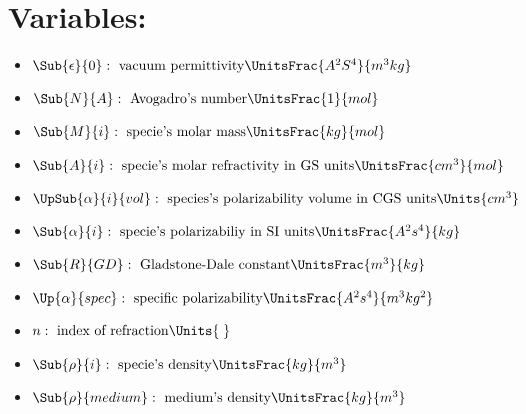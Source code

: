 



\usepackage{mcode}

    
    \section*{Variables:}
    \begin{itemize}
        \item $ \Sub{\epsilon}{0}:\text{ vacuum permittivity}\UnitsFrac{A^2S^4}{m^3kg} $ 
        \item $ \Sub{N}{A}:\text{ Avogadro's number}\UnitsFrac{1}{mol} $
        \item $ \Sub{M}{i}:\text{ specie's molar mass}\UnitsFrac{kg}{mol} $
        \item $ \Sub{A}{i}: \text{ specie's molar refractivity in GS units}\UnitsFrac{cm^3}{mol} $ 
        \item $ \UpSub{\alpha}{i}{vol}:\text{ species's polarizability volume in CGS units}\Units{cm^3} $
        \item $ \Sub{\alpha}{i}:\text{ specie's polarizabiliy in SI units}\UnitsFrac{A^2s^4}{kg} $
        \item $ \Sub{R}{GD}:\text{ Gladstone-Dale constant}\UnitsFrac{m^3}{kg} $
        \item $ \Up{\alpha}{spec}:\text{ specific polarizability}\UnitsFrac{A^2s^4}{m^3kg^2} $
        \item $ n:\text{ index of refraction}\Units{\;} $
        \item $ \Sub{\rho}{i}:\text{ specie's density}\UnitsFrac{kg}{m^3} $
        \item $ \Sub{\rho}{medium}:\text{ medium's density}\UnitsFrac{kg}{m^3} $
    \end{itemize}
        
